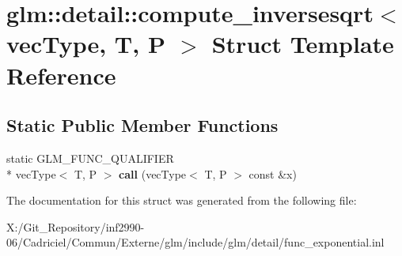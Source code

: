\hypertarget{structglm_1_1detail_1_1compute__inversesqrt}{\section{glm\-:\-:detail\-:\-:compute\-\_\-inversesqrt$<$ vec\-Type, T, P $>$ Struct Template Reference}
\label{structglm_1_1detail_1_1compute__inversesqrt}
}
\subsection*{Static Public Member Functions}
\begin{DoxyCompactItemize}
\item 
\hypertarget{structglm_1_1detail_1_1compute__inversesqrt_a691942b1bfc04c3563e179ff2fef5375}{static G\-L\-M\-\_\-\-F\-U\-N\-C\-\_\-\-Q\-U\-A\-L\-I\-F\-I\-E\-R \\*
vec\-Type$<$ T, P $>$ {\bfseries call} (vec\-Type$<$ T, P $>$ const \&x)}\label{structglm_1_1detail_1_1compute__inversesqrt_a691942b1bfc04c3563e179ff2fef5375}

\end{DoxyCompactItemize}


The documentation for this struct was generated from the following file\-:\begin{DoxyCompactItemize}
\item 
X\-:/\-Git\-\_\-\-Repository/inf2990-\/06/\-Cadriciel/\-Commun/\-Externe/glm/include/glm/detail/func\-\_\-exponential.\-inl\end{DoxyCompactItemize}
